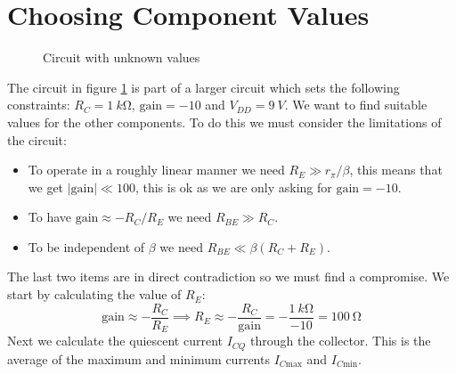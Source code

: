 \documentclass{article}
\begin{document}
    \section{Choosing Component Values}
    \begin{figure}[ht]
        \centering
        \caption{Circuit with unknown values}
        \label{fig:circuit with unknown values}
    \end{figure}
    The circuit in figure \ref{fig:circuit with unknown values} is part of a larger circuit which sets the following constraints: \(R_C = \SI{1}{k\ohm}\), \(\text{gain} = -10\) and \(V_{DD} = \SI{9}{V}\).
    We want to find suitable values for the other components.
    To do this we must consider the limitations of the circuit:
    \begin{itemize}
        \item To operate in a roughly linear manner we need \(R_E\gg r_\pi/\beta\), this means that we get \(|\text{gain}|\ll 100\), this is ok as we are only asking for \(\text{gain} = -10\).
        \item To have \(\text{gain}\approx -R_C/R_E\) we need \(R_{BE}\gg R_C\).
        \item To be independent of \(\beta\) we need \(R_{BE}\ll \beta(R_C + R_E)\).
    \end{itemize}
    The last two items are in direct contradiction so we must find a compromise.
    We start by calculating the value of \(R_E\):
    \[\text{gain} \approx-\frac{R_C}{R_E}\implies R_E\approx -\frac{R_C}{\text{gain}} = -\frac{\SI{1}{k\ohm}}{-10} = \SI{100}{\ohm}\]
    Next we calculate the quiescent current \(I_{CQ}\) through the collector.
    This is the average of the maximum and minimum currents \(I_{C\text{max}}\) and \(I_{C\text{min}}\).
\end{document}
